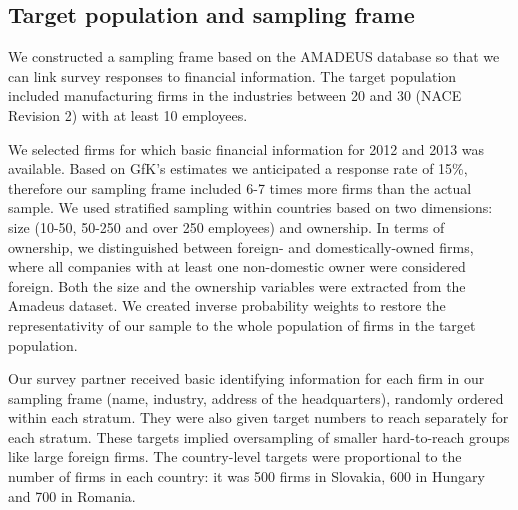 \documentclass[final, dvipsnames, authoryear,12pt]{elsarticle}
\begin{document}

\subsection{Target population and sampling frame}

We constructed a sampling frame based on the AMADEUS database \citep{amadeus} so that we can link survey responses to financial information. The target population included manufacturing firms in the industries between 20 and 30 (NACE Revision 2) with at least 10 employees.

We selected firms for which basic financial information for 2012 and 2013 was available. Based on GfK's estimates we anticipated a response rate of 15\%, therefore our sampling frame included 6-7 times more firms than the actual sample. We used stratified sampling within countries based on two dimensions: size (10-50, 50-250 and over 250 employees) and ownership. In terms of ownership, we distinguished between foreign- and domestically-owned firms, where all companies with at least one non-domestic owner were considered foreign. Both the size and the ownership variables were extracted from the Amadeus dataset. We created inverse probability weights to restore the representativity of our sample to the whole population of firms in the target population.

Our survey partner received basic identifying information for each firm in our sampling frame (name, industry, address of the headquarters), randomly ordered within each stratum. They were also given target numbers to reach separately for each stratum. These targets implied oversampling of smaller hard-to-reach groups like large foreign firms. The country-level targets were proportional to the number of firms in each country: it was 500 firms in Slovakia, 600 in Hungary and 700 in Romania.


\end{document}
